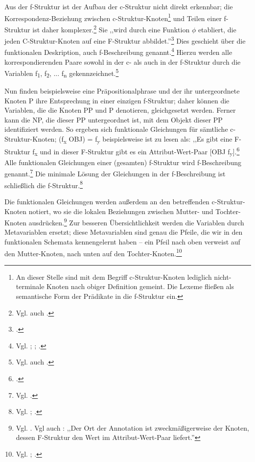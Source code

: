 \documentclass[12pt,a4paper]{article}
\begin{document}
Aus der f-Struktur ist der Aufbau der c-Struktur nicht direkt erkennbar; die Korrespondenz-Beziehung zwischen c-Struktur-Knoten\footnote{An dieser Stelle sind mit dem Begriff c-Struktur-Knoten lediglich nicht-terminale Knoten nach obiger Definition gemeint. Die Lexeme fließen als semantische Form der Prädikate in die f-Struktur ein.} und Teilen einer f-Struktur ist daher komplexer.\footnote{Vgl. auch \cite[55]{Falk}.} Sie ,,wird durch eine Funktion $\phi$ etabliert, die jeden C-Struktur-Knoten auf eine F-Struktur abbildet.''\footnote{\cite[8]{Skript}.} Dies geschieht über die funktionalen Deskription, auch f-Beschreibung genannt.\footnote{Vgl. \cite[63-4]{Falk}; \cite[34]{Rohrer}; \cite[17]{Skript}.} Hierzu werden alle korrespondierenden Paare sowohl in der c- als auch in der f-Struktur durch die Variablen f\textsubscript{1}, f\textsubscript{2}, ... f\textsubscript{n} gekennzeichnet.\footnote{Vgl. auch \cite[65]{Falk}.} 

Nun finden beispielsweise eine Präpositionalphrase und der ihr untergeordnete Knoten P ihre Entsprechung in einer einzigen f-Struktur; daher können die Variablen, die die Knoten PP und P denotieren, gleichgesetzt werden. Ferner kann die NP, die dieser PP untergeordnet ist, mit dem Objekt dieser PP identifiziert werden. So ergeben sich funktionale Gleichungen für sämtliche c-Struktur-Knoten; (f\textsubscript{x} OBJ) = f\textsubscript{y} beispielsweise ist zu lesen als: ,,Es gibt eine F-Struktur f\textsubscript{x} und in dieser F-Struktur gibt es ein Attribut-Wert-Paar [OBJ f\textsubscript{y}].\footnote{\cite[12]{Skript}.}
Alle funktionalen Gleichungen einer (gesamten) f-Struktur wird f-Beschreibung genannt.\footnote{Vgl. \cite[66-8]{Falk}.} Die minimale Lösung der Gleichungen in der f-Beschreibung ist schließlich die f-Struktur.\footnote{Vgl. \cite[68]{Falk}; \cite[17]{Skript}.}

Die funktionalen Gleichungen werden außerdem an den betreffenden c-Struktur-Knoten notiert, wo sie die lokalen Beziehungen zwischen Mutter- und Tochter-Knoten ausdrücken.\footnote{Vgl. \cite[69]{Falk}. Vgl auch \cite[12]{Skript}: ,,Der Ort der Annotation ist zweckmäßigerweise der Knoten, dessen F-Struktur den Wert im Attribut-Wert-Paar liefert.''} Zur besseren Übersichtlichkeit werden die Variablen durch Metavariablen ersetzt; diese Metavariablen sind genau die Pfeile, die wir in den funktionalen Schemata kennengelernt haben -- ein Pfeil nach oben verweist auf den Mutter-Knoten, nach unten auf den Tochter-Knoten.\footnote{Vgl. \cite[69]{Falk}; \cite[15-6]{Skript}.}
\end{document}

